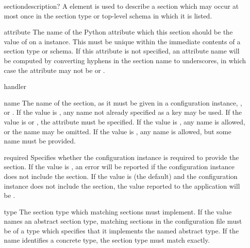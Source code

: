 \documentclass{howto}
\newcommand{\datatype}[1]{\strong{#1}}
\begin{document}
\begin{elementdesc}{section}{description?}
  A  element is used to describe a section which may
  occur at most once in the section type or top-level schema in which
  it is listed.

  \begin{attributedesc}{attribute}{\datatype{identifier}}
    The name of the Python attribute which this section should be the
    value of on a  instance.  This must be unique
    within the immediate contents of a section type or schema.  If
    this attribute is not specified, an attribute name will be
    computed by converting hyphens in the section name to underscores,
    in which case the  attribute may not be \code{*}
    or \code{+}.
  \end{attributedesc}

  \begin{attributedesc}{handler}{\datatype{basic-key}}
  \end{attributedesc}

  \begin{attributedesc}{name}{\datatype{basic-key}}
    The name of the section, as it must be given in a configuration
    instance, \code{*}, or \code{+}.  If the value is \code{*}, any
    name not already specified as a key may be used.  If the value is
    \code{*} or \code{+}, the  attribute must be
    specified.  If the value is \code{*}, any name is allowed, or the
    name may be omitted.  If the value is \code{+}, any name is
    allowed, but some name must be provided.
  \end{attributedesc}

  \begin{attributedesc}{required}{}
    Specifies whether the configuration instance is required to
    provide the section.  If the value is , an error will be
    reported if the configuration instance does not include the
    section.  If the value is  (the default) and the
    configuration instance does not include the section, the value
    reported to the application will be .
  \end{attributedesc}

  \begin{attributedesc}{type}{\datatype{basic-key}}
    The section type which matching sections must implement.  If the
    value names an abstract section type, matching sections in the
    configuration file must be of a type which specifies that it
    implements the named abstract type.  If the name identifies a
    concrete type, the section type must match exactly.
  \end{attributedesc}
\end{elementdesc}
\end{document}

